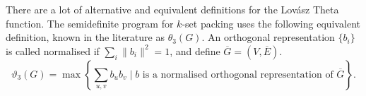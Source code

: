 There are a lot of alternative and equivalent definitions for the Lov\'{a}sz Theta function. The semidefinite program for $k$-set packing uses the following equivalent definition, known in the literature as $\theta_3(G)$. An orthogonal representation $\{b_i\}$ is called normalised if $\sum_i \|b_i\|^2 = 1$, and define $\overline{G} = (V,\overline{E})$.
%
%
%
\begin{equation*}
\vartheta_3(G) = \max \left\{ \sum_{u,v} b_u b_v \mid b \textrm{ is a normalised orthogonal representation of } \overline{G} \right\}.
\end{equation*}


